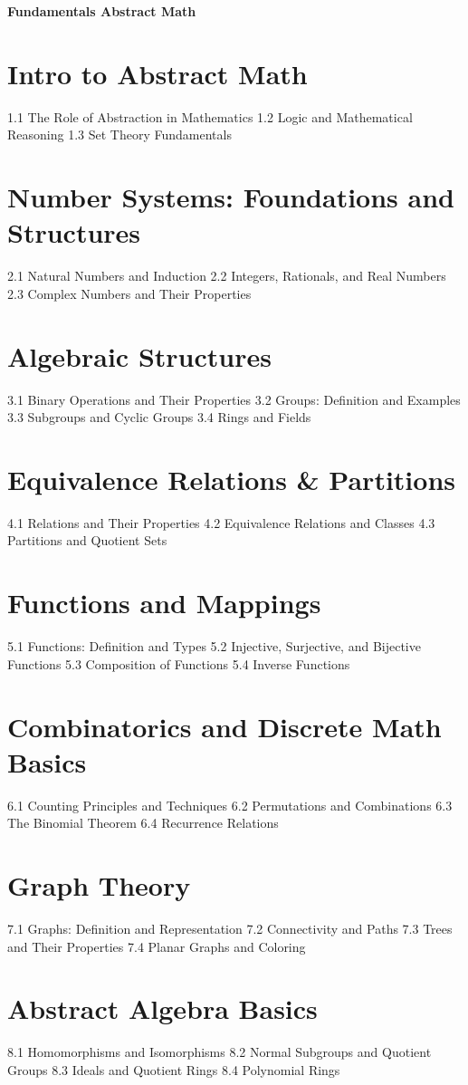 {\LARGE \bf{Fundamentals Abstract Math}}
\section{Intro to Abstract Math}
1.1 The Role of Abstraction in Mathematics
1.2 Logic and Mathematical Reasoning
1.3 Set Theory Fundamentals
\section{Number Systems: Foundations and Structures}
2.1 Natural Numbers and Induction
2.2 Integers, Rationals, and Real Numbers
2.3 Complex Numbers and Their Properties
\section{Algebraic Structures}
3.1 Binary Operations and Their Properties
3.2 Groups: Definition and Examples
3.3 Subgroups and Cyclic Groups
3.4 Rings and Fields
\section{Equivalence Relations \& Partitions}
4.1 Relations and Their Properties
4.2 Equivalence Relations and Classes
4.3 Partitions and Quotient Sets
\section{Functions and Mappings}
5.1 Functions: Definition and Types
5.2 Injective, Surjective, and Bijective Functions
5.3 Composition of Functions
5.4 Inverse Functions
\section{Combinatorics and Discrete Math Basics}
6.1 Counting Principles and Techniques
6.2 Permutations and Combinations
6.3 The Binomial Theorem
6.4 Recurrence Relations
\section{Graph Theory}
7.1 Graphs: Definition and Representation
7.2 Connectivity and Paths
7.3 Trees and Their Properties
7.4 Planar Graphs and Coloring
\section{Abstract Algebra Basics}
8.1 Homomorphisms and Isomorphisms
8.2 Normal Subgroups and Quotient Groups
8.3 Ideals and Quotient Rings
8.4 Polynomial Rings
